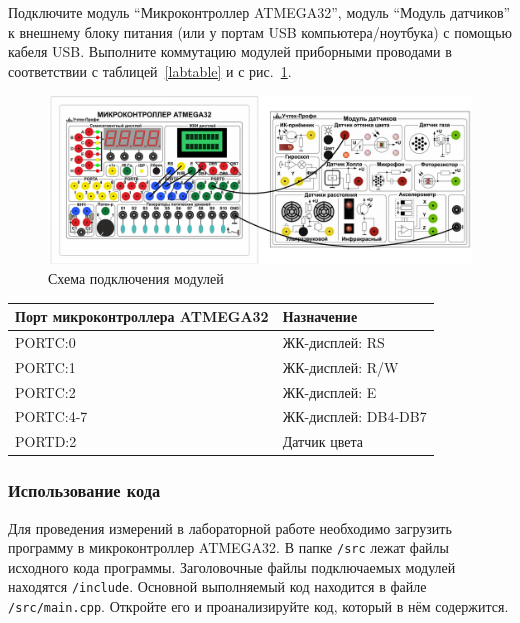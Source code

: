\documentclass[12pt]{article}
\begin{document}
Подключите модуль ``Микроконтроллер ATMEGA32'', модуль ``Модуль датчиков'' к внешнему блоку питания (или у портам USB компьютера/ноутбука) с помощью кабеля USB. Выполните коммутацию модулей приборными проводами в соответствии с таблицей~\ref{labtable}  и с рис.~\ref{labscheme}.

\begin{figure}[H]
    \centering
    \includegraphics[scale=0.65]{images/lab2-scheme.png}
    \caption{Схема подключения модулей}\label{labscheme}
\end{figure}

\begin{table}[H]
    \caption{Коммутация модулей}\label{labtable}
    \begin{longtable}[]{@{}l|l@{}}
        \toprule
        Порт микроконтроллера ATMEGA32 & Назначение \\
        \midrule
        \endhead
        PORTC:0 & ЖК-дисплей: RS \\
        PORTC:1 & ЖК-дисплей: R/W \\
        PORTC:2 & ЖК-дисплей: E \\
        PORTC:4-7 & ЖК-дисплей: DB4-DB7 \\
        PORTD:2 & Датчик цвета \\
        \bottomrule
    \end{longtable}  
\end{table}

\subsubsection{Использование кода}

Для проведения измерений в лабораторной работе необходимо загрузить программу в микроконтроллер ATMEGA32. В папке \texttt{/src} лежат файлы исходного кода программы. Заголовочные файлы подключаемых модулей находятся \texttt{/include}. Основной выполняемый код находится в файле \texttt{/src/main.cpp}. Откройте его и проанализируйте код, который в нём содержится.
\end{document}
